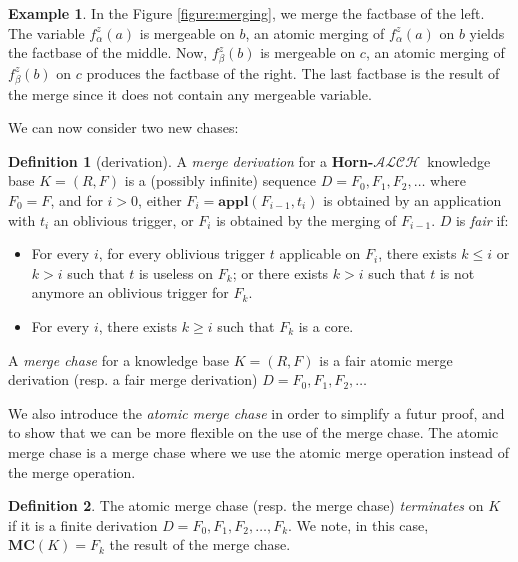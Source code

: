 \documentclass{article}
\theoremstyle{definition}
\newtheorem{definition}{Definition}[section]
\newtheorem{example}{Example}[section]
\theoremstyle{remark}
\newcommand{\MC}{\textbf{MC}}
\newcommand{\Appl}{\textbf{appl}}
\newcommand{\ALCH}{\textbf{Horn-$\mathcal{ALCH}$}}
\begin{document}
\begin{example} \label{example: merging}
In the Figure \ref{figure:merging}, we merge the factbase of the left. The variable $f_\alpha^z(a)$ is mergeable on $b$, an atomic merging of $f_\alpha^z(a)$ on $b$ yields the factbase of the middle. Now, $f_\beta^z(b)$ is mergeable on $c$, an atomic merging of $f_\beta^z(b)$ on $c$ produces the factbase of the right. The last factbase is the result of the merge since it does not contain any mergeable variable.

\end{example}



We can now consider two new chases:

\begin{definition}[derivation] \label{fairness}
A \emph{merge derivation} for a \ALCH\ knowledge base $K = (R,F)$ is a (possibly infinite) sequence $D = F_0, F_1, F_2, \ldots$ where $F_0 = F$, and for $i >0$, either $F_{i}= \Appl(F_{i-1},t_i)$ is obtained by an application with $t_i$ an oblivious trigger, or $F_i$ is obtained by the merging of $F_{i-1}$. $D$ is \emph{fair} if: 
\begin{itemize}
\item For every $i$, for every oblivious trigger $t$ applicable on $F_i$, there exists $k \leq i$ or $k > i$ such that $t$ is useless on $F_k$; or there exists $k > i$ such that $t$ is not anymore an oblivious trigger for $F_k$.
\item For every $i$, there exists $k \geq i$ such that $F_k$ is a core.
\end{itemize}

A \emph{merge chase} for a knowledge base $K= (R,F)$ is a fair atomic merge derivation (resp. a fair merge derivation) $D=F_0,F_1,F_2,\ldots$
\end{definition}

We also introduce the \emph{atomic merge chase} in order to simplify a futur proof, and to show that we can be more flexible on the use of the merge chase. The atomic merge chase is a merge chase where we use the atomic merge operation instead of the merge operation.   

\begin{definition}
The atomic merge chase (resp. the merge chase)  \emph{terminates} on $K$ if it is a finite derivation $D=F_0,F_1,F_2,\ldots,F_k$. We note, in this case, $\MC(K) = F_k$ the result of the merge chase.
\end{definition}
\end{document}
